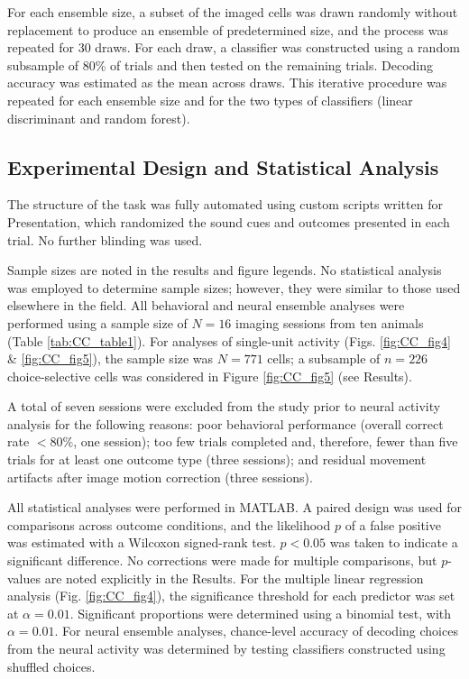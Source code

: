 For each ensemble size, a subset of the imaged cells was drawn randomly without replacement to produce an ensemble of predetermined size, and the process was repeated for 30 draws. For each draw, a classifier was constructed using a random subsample of 80\% of trials and then tested on the remaining trials. Decoding accuracy was estimated as the mean across draws. This iterative procedure was repeated for each ensemble size and for the two types of classifiers (linear discriminant and random forest).

\subsection*{Experimental Design and Statistical Analysis}
The structure of the task was fully automated using custom scripts written for Presentation, which randomized the sound cues and outcomes presented in each trial. No further blinding was used. 

Sample sizes are noted in the results and figure legends. No statistical analysis was employed to determine sample sizes; however, they were similar to those used elsewhere in the field. All behavioral and neural ensemble analyses were performed using a sample size of $N = 16$ imaging sessions from ten animals (Table \ref{tab:CC_table1}). For analyses of single-unit activity (Figs. \ref{fig:CC_fig4} \& \ref{fig:CC_fig5}), the sample size was $N = 771$ cells; a subsample of $n = 226$ choice-selective cells was considered in Figure \ref{fig:CC_fig5} (see Results). 

A total of seven sessions were excluded from the study prior to neural activity analysis for the following reasons: poor behavioral performance (overall correct rate $<80\%$, one session); too few trials completed and, therefore, fewer than five trials for at least one outcome type (three sessions); and residual movement artifacts after image motion correction (three sessions). 

All statistical analyses were performed in MATLAB. A paired design was used for comparisons across outcome conditions, and the likelihood $p$ of a false positive was estimated with a Wilcoxon signed-rank test. $p < 0.05$ was taken to indicate a significant difference. No corrections were made for multiple comparisons, but $p$-values are noted explicitly in the Results. For the multiple linear regression analysis (Fig. \ref{fig:CC_fig4}), the significance threshold for each predictor was set at $\alpha = 0.01$. Significant proportions were determined using a binomial test, with $\alpha = 0.01$. For neural ensemble analyses, chance-level accuracy of decoding choices from the neural activity was determined by testing classifiers constructed using shuffled choices.